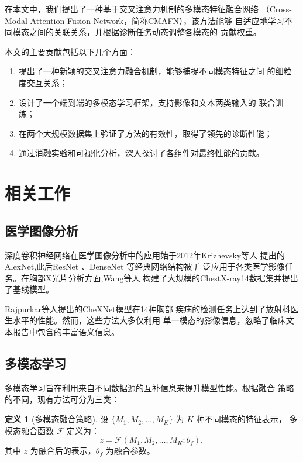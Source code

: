 \documentclass[12pt,a4paper]{article}
\theoremstyle{definition}
\newtheorem{definition}{定义}[section]
\begin{document}
在本文中，我们提出了一种基于交叉注意力机制的多模态特征融合网络
（Cross-Modal Attention Fusion Network，简称CMAFN），该方法能够
自适应地学习不同模态之间的关联关系，并根据诊断任务动态调整各模态的
贡献权重。

本文的主要贡献包括以下几个方面：
\begin{enumerate}[label=(\arabic*)]
  \item 提出了一种新颖的交叉注意力融合机制，能够捕捉不同模态特征之间
    的细粒度交互关系；
  \item 设计了一个端到端的多模态学习框架，支持影像和文本两类输入的
    联合训练；
  \item 在两个大规模数据集上验证了方法的有效性，取得了领先的诊断性能；
  \item 通过消融实验和可视化分析，深入探讨了各组件对最终性能的贡献。
\end{enumerate}


\section{相关工作}

\subsection{医学图像分析}

深度卷积神经网络在医学图像分析中的应用始于2012年Krizhevsky等人
\cite{krizhevsky2012imagenet}提出的AlexNet,此后ResNet
\cite{he2016deep}、DenseNet \cite{huang2017densely}等经典网络结构被
广泛应用于各类医学影像任务。在胸部X光片分析方面,Wang等人
\cite{wang2017chestx}构建了大规模的ChestX-ray14数据集并提出了基线模型。

Rajpurkar等人\cite{rajpurkar2017chexnet}提出的CheXNet模型在14种胸部
疾病的检测任务上达到了放射科医生水平的性能。然而，这些方法大多仅利用
单一模态的影像信息，忽略了临床文本报告中包含的丰富语义信息。

\subsection{多模态学习}

多模态学习旨在利用来自不同数据源的互补信息来提升模型性能。根据融合
策略的不同，现有方法可分为三类：

\begin{definition}[多模态融合策略]
设 $\{M_1, M_2, \ldots, M_K\}$ 为 $K$ 种不同模态的特征表示，
多模态融合函数 $\mathcal{F}$ 定义为：
\begin{equation}\label{eq:fusion-def}
  z = \mathcal{F}(M_1, M_2, \ldots, M_K; \theta_f),
\end{equation}
其中 $z$ 为融合后的表示，$\theta_f$ 为融合参数。
\end{definition}
\end{document}
